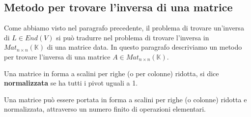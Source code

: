 
\subsection{Metodo per trovare l'inversa di una matrice}
Come abbiamo visto nel paragrafo precedente, il problema di trovare un'inversa
di $L \in End(V)$ si pu\`o tradurre nel problema di trovare l'inversa in
$Mat_{n \times n}(\mathbb{K})$ di una matrice data. In questo paragrafo descriviamo
un metodo per trovare l'inversa di una matrice $A \in Mat_{n \times n}(\mathbb{K})$.

\begin{defn}
	Una matrice in forma a scalini per righe (o per colonne) ridotta, si dice
	\textbf{normalizzata} se ha tutti i pivot uguali a 1.
\end{defn}

\begin{observation}
	Una matrice pu\`o essere portata in forma a scalini per righe (o colonne)
	ridotta e normalizzata, attraverso un numero finito di operazioni elementari.
\end{observation}


